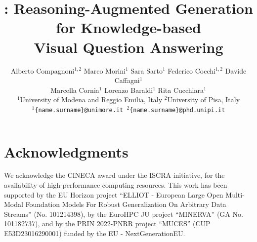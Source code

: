 \documentclass[10pt,twocolumn,letterpaper]{article}
\title{\ours: Reasoning-Augmented Generation for Knowledge-based\\Visual Question Answering}
\author{Alberto Compagnoni$^{1,2}$ \quad Marco Morini$^1$ \quad Sara Sarto$^1$ \quad Federico Cocchi$^{1,2}$ \quad Davide Caffagni$^1$ \\ Marcella Cornia$^1$ \quad Lorenzo Baraldi$^1$ \quad Rita  Cucchiara$^{1}$  \\
$^1$University of Modena and Reggio Emilia, Italy \quad $^2$University of Pisa, Italy\\
{\tt\small $^1$\{name.surname\}@unimore.it \quad $^2$\{name.surname\}@phd.unipi.it}
}
\begin{document}
\maketitle
    







\section*{Acknowledgments}
We acknowledge the CINECA award under the ISCRA initiative, for the availability of high-performance computing resources. This work has been supported by the EU Horizon project ``ELLIOT -  European Large Open Multi-Modal Foundation Models For Robust Generalization On Arbitrary Data Streams'' (No. 101214398), by the EuroHPC JU project ``MINERVA'' (GA No. 101182737), and by the PRIN 2022-PNRR project ``MUCES'' (CUP E53D23016290001) funded by the EU - NextGenerationEU.


{
    \small
    
    
}



% 




\end{document}
